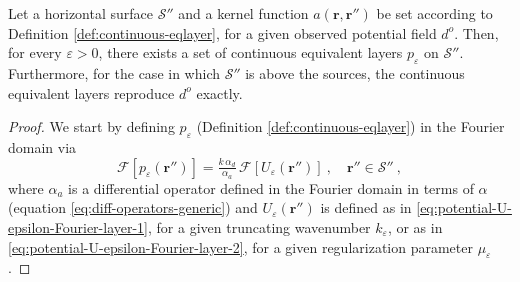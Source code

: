 \begin{theorem}
	\label{theorem:planar-eqlayer-theorem}
	Let a horizontal surface $\mathcal{S}''$ and a kernel function $a(\mathbf{r}, \mathbf{r}'')$ 
	be set according to Definition \ref{def:continuous-eqlayer}, for a given observed potential field $d^{o}$. 
	Then, for every $\varepsilon > 0$, there exists a set of continuous equivalent layers $p_{\varepsilon}$ on $\mathcal{S}''$. 
	Furthermore, for the case in which $\mathcal{S}''$ is above the sources, the continuous equivalent layers 
	reproduce $d^{o}$ exactly.
\end{theorem}
\begin{proof}
	We start by defining $p_{\varepsilon}$ (Definition \ref{def:continuous-eqlayer}) 
	in the Fourier domain via
	\begin{equation}
		\mathcal{F} [ p_{\varepsilon}(\mathbf{r}'') ] =
		\tfrac{k \, \alpha_{d}}{\alpha_{a}} \,
		\mathcal{F} [ U_{\varepsilon}(\mathbf{r}'') ] \: ,
		\quad \mathbf{r}'' \in \mathcal{S}'' \: ,
		\label{eq:p-Fourier}
	\end{equation}
	where $\alpha_{a}$ is a differential operator 
	defined in the Fourier domain in terms of $\alpha$ (equation \ref{eq:diff-operators-generic}) and
	$U_{\varepsilon}(\mathbf{r}'')$ is defined as in \ref{eq:potential-U-epsilon-Fourier-layer-1},
	for a given truncating wavenumber $k_{\varepsilon}$, or as in \ref{eq:potential-U-epsilon-Fourier-layer-2},
	for a given regularization parameter $\mu_{\varepsilon}$. 
	

\end{proof}
